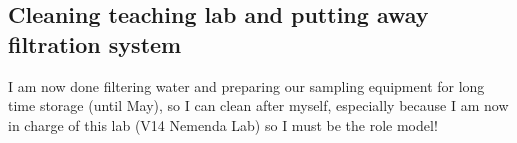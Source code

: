 \subsection{Cleaning teaching lab and putting away filtration system}
\label{task:20180308_cj3}

I am now done filtering water and preparing our sampling equipment for long time storage (until May), so I can clean after myself, especially because I am now in charge of this lab (V14 Nemenda Lab) so I must be the role model!

